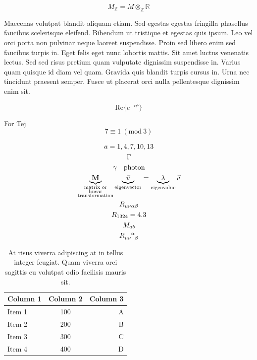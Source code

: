\documentclass[10pt, a4paper]{article}
\numberwithin{equation}{section}
\begin{document}
\begin{equation}
  M_{\mathbb{Z}} = M \otimes_{\mathbb{Z}} \mathbb{R}
\end{equation}

Maecenas volutpat blandit aliquam etiam. Sed egestas egestas fringilla phasellus faucibus scelerisque eleifend. Bibendum ut tristique et egestas quis ipsum. Leo vel orci porta non pulvinar neque laoreet suspendisse. Proin sed libero enim sed faucibus turpis in. Eget felis eget nunc lobortis mattis. Sit amet luctus venenatis lectus. Sed sed risus pretium quam vulputate dignissim suspendisse in. Varius quam quisque id diam vel quam. Gravida quis blandit turpis cursus in. Urna nec tincidunt praesent semper. Fusce ut placerat orci nulla pellentesque dignissim enim sit.

\begin{equation}
  \mathrm{Re} \{ e^{-i \psi} \}
\end{equation}

For Tej
\begin{equation}
  7 \equiv 1 \ (\mathrm{mod} \ 3)
\end{equation}

\begin{gather}
  a = 1, 4, 7, 10, 13 \\
  \Gamma \\
  \gamma \quad \text{photon} \\
  \underbrace{\mathbf{M}}_{\substack{\text{matrix or} \\ \text{linear} \\ \text{transformation}}} \underbrace{\vec{v}}_{\text{eigenvector}} = \underbrace{\lambda}_{\text{eigenvalue}} \vec{v} \\
  R_{\mu \nu \alpha \beta} \\
  R_{1 3 2 4} = 4.3 \\
  M_{a b} \\
  \tensor{R}{_\mu_\nu^\alpha_\beta}
\end{gather}

\begin{table}[ht]
  \centering
  \caption{At risus viverra adipiscing at in tellus integer feugiat. Quam viverra orci sagittis eu volutpat odio facilisis mauris sit.}
  \label{tab:sampledata}
  \begin{tabular}{@{}lcr@{}} %
  \toprule
  Column 1 & Column 2 & Column 3 \\
  \midrule
  Item 1 & 100 & A \\
  Item 2 & 200 & B \\
  Item 3 & 300 & C \\
  Item 4 & 400 & D \\
  \bottomrule
  \end{tabular}
\end{table}
\end{document}
